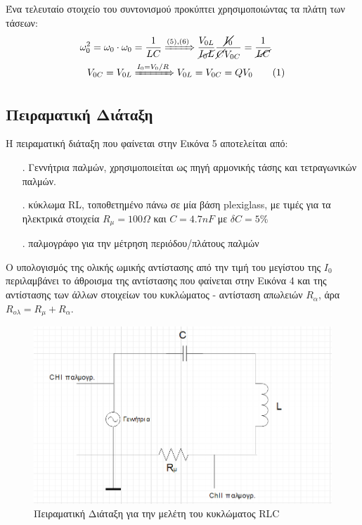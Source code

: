 \documentclass[a4paper]{article}
\newcommand\numberthis{\addtocounter{equation}{1}\tag{\theequation}}
\begin{document}
Ένα τελευταίο στοιχείο του συντονισμού προκύπτει χρησιμοποιώντας τα πλάτη των τάσεων:
\begin{align*}\label{13}
\omega_0^2 = \omega_0\cdot \omega_0 &= \frac{1}{LC} \xRightarrow{(5),(6)} \frac{V_{0L}}{\cancel{I_0L}}\frac{\cancel{I_0}}{\cancel{C}V_{0C}} = \frac{1}{\cancel{LC}}\\
V_{0C} = V_{0L} & \xRightarrow{I_0=V_0/R}  V_{0L} = V_{0C} = Q V_0 \numberthis
\end{align*}


\subsection*{Πειραματική Διάταξη }
Η πειραματική διάταξη που φαίνεται στην Εικόνα 5 αποτελείται από: 
\begin{itemize}
\item[.] Γεννήτρια παλμών, χρησιμοποιείται ως πηγή αρμονικής τάσης και τετραγωνικών παλμών.
\item[.] κύκλωμα RL, τοποθετημένο πάνω σε μία βάση plexiglass, με τιμές για τα ηλεκτρικά στοιχεία $R_\mu = 100\Omega$ και $C=4.7nF$ με $\delta C =5\%$
\item[.] παλμογράφο για την μέτρηση περιόδου/πλάτους παλμών
\end{itemize}


Ο υπολογισμός της ολικής ωμικής αντίστασης από την τιμή του μεγίστου της $I_0$ περιλαμβάνει το άθροισμα της αντίστασης που φαίνεται στην Εικόνα 4 και της αντίστασης των άλλων στοιχείων του κυκλώματος - αντίσταση απωλειών $R_\alpha$, άρα $R_{ολ}=R_\mu+R_\alpha$.


\begin{figure}[h!]
\centering 
\caption{ Πειραματική Διάταξη για την μελέτη του κυκλώματος RLC }
\includegraphics[scale=0.35]{circ.png}
\end{figure}
\end{document}
